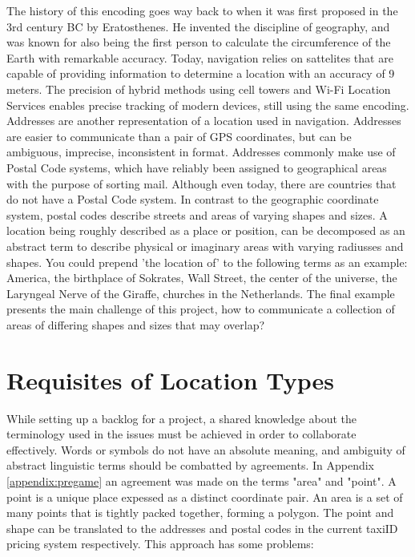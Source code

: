 The history of this encoding goes way back to when it was first proposed in the 3rd century BC by Eratosthenes. He invented the discipline of geography, and was known for also being the first person to calculate the circumference of the Earth with remarkable accuracy. Today, navigation relies on sattelites that are capable of providing information to determine a location with an accuracy of 9 meters. The precision of hybrid methods using cell towers and Wi-Fi Location Services enables precise tracking of modern devices, still using the same encoding. Addresses are another representation of a location used in navigation. Addresses are easier to communicate than a pair of GPS coordinates, but can be ambiguous, imprecise, inconsistent in format. Addresses commonly make use of Postal Code systems, which have reliably been assigned to geographical areas with the purpose of sorting mail. Although even today, there are countries that do not have a Postal Code system. In contrast to the geographic coordinate system, postal codes describe streets and areas of varying shapes and sizes. A location being roughly described as a place or position, can be decomposed as an abstract term to describe physical or imaginary areas with varying radiusses and shapes. You could prepend 'the location of' to the following terms as an example: America, the birthplace of Sokrates, Wall Street, the center of the universe, the Laryngeal Nerve of the Giraffe, churches in the Netherlands. The final example presents the main challenge of this project, how to communicate a collection of areas of differing shapes and sizes that may overlap?

%
\section{Requisites of Location Types}
While setting up a backlog for a project, a shared knowledge about the terminology used in the issues must be achieved in order to collaborate effectively. Words or symbols do not have an absolute meaning, and ambiguity of abstract linguistic terms should be combatted by agreements. In Appendix \ref{appendix:pregame} an agreement was made on the terms "area" and "point".
A point is a unique place expessed as a distinct coordinate pair. An area is a set of many points that is tightly packed together, forming a polygon. The point and shape can be translated to the addresses and postal codes in the current taxiID pricing system respectively. This approach has some problems:

